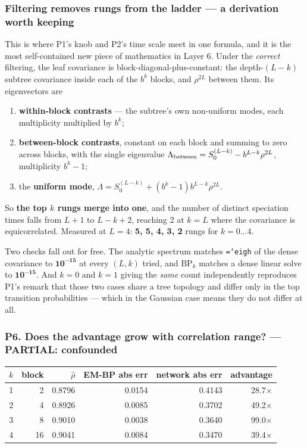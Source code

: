 \documentclass[11pt,a4paper]{article}
\newcommand{\partialx}{\textcolor{WarnAmber}{\textbf{PARTIAL}}}
\newcommand{\code}[1]{\texttt{\small\hyphenchar\font=`\-\relax #1}}
\begin{document}
\subsubsection*{Filtering removes rungs from the ladder --- a derivation worth keeping}

This is where P1's knob and P2's time scale meet in one formula, and it is the most
self-contained new piece of mathematics in Layer 6. Under the \emph{correct} filtering, the
leaf covariance is block-diagonal-plus-constant: the depth-$(L-k)$ subtree covariance inside
each of the $b^k$ blocks, and $\rho^{2L}$ between them. Its eigenvectors are

\begin{enumerate}
\item \textbf{within-block contrasts} --- the subtree's own non-uniform modes, each
multiplicity multiplied by $b^k$;
\item \textbf{between-block contrasts}, constant on each block and summing to zero across
blocks, with the single eigenvalue
$\Lambda_{\rm between} = S_0^{(L-k)} - b^{L-k}\rho^{2L}$, multiplicity $b^k - 1$;
\item the \textbf{uniform mode}, $\Lambda = S_0^{(L-k)} + (b^k-1)b^{L-k}\rho^{2L}$.
\end{enumerate}

\noindent
So \textbf{the top $k$ rungs merge into one}, and the number of distinct speciation times
falls from $L+1$ to $L-k+2$, reaching 2 at $k=L$ where the covariance is equicorrelated.
Measured at $L=4$: \textbf{5, 5, 4, 3, 2} rungs for $k=0\dots4$.

Two checks fall out for free. The analytic spectrum matches \code{eigh} of the dense
covariance to $\mathbf{10^{-15}}$ at every $(L,k)$ tried, and $\mathrm{BP}_k$ matches a dense
linear solve to $\mathbf{10^{-15}}$. And $k=0$ and $k=1$ giving the \emph{same} count
independently reproduces P1's remark that those two cases share a tree topology and differ
only in the top transition probabilities --- which in the Gaussian case means they do not
differ at all.

\subsubsection*{P6. Does the advantage grow with correlation range? --- \partialx: confounded}

\begin{center}
\begin{tabular}{@{}rrrrrr@{}}
\toprule
$k$ & block & $\hat\rho$ & EM-BP abs err & network abs err & advantage \\
\midrule
1 & 2  & 0.8796 & 0.0154 & 0.4143 & 28.7$\times$ \\
2 & 4  & 0.8926 & 0.0085 & 0.3702 & 49.2$\times$ \\
3 & 8  & 0.9010 & 0.0038 & 0.3640 & 99.0$\times$ \\
4 & 16 & 0.9041 & 0.0084 & 0.3470 & 39.4$\times$ \\
\bottomrule
\end{tabular}
\end{center}
\end{document}
